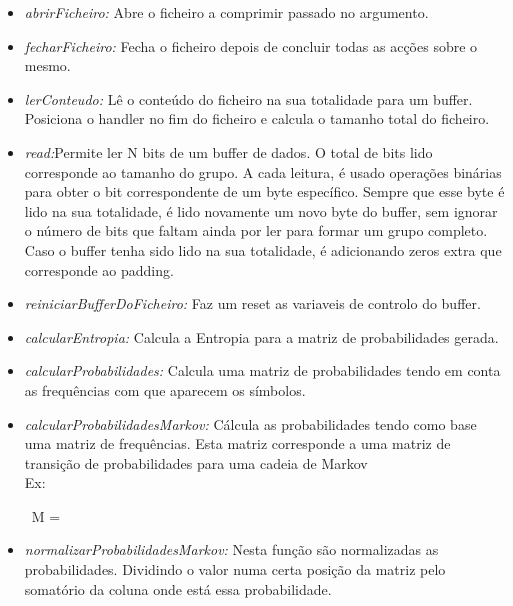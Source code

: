 \documentclass[paper=a4, fontsize=11pt]{scrartcl}
\numberwithin{equation}{section}		%
\numberwithin{figure}{section}			%
\numberwithin{table}{section}				%
\begin{document}
\begin{itemize}
\item {\it abrirFicheiro:} Abre o ficheiro a comprimir passado no argumento.

\item {\it fecharFicheiro:} Fecha o ficheiro depois de concluir todas as acções sobre o mesmo.

\item {\it lerConteudo:} Lê o conteúdo do ficheiro na sua totalidade para um buffer.
\\Posiciona o handler no fim do ficheiro e calcula o tamanho total do ficheiro.

\item {\it read:}Permite ler N bits de um buffer de dados. O total de bits lido corresponde ao tamanho do grupo. A cada leitura, é usado operações binárias para obter o bit correspondente de um byte específico. Sempre que esse byte é lido na sua totalidade, é lido novamente um novo byte do buffer, sem ignorar o número de bits que faltam ainda por ler para formar um grupo completo.
\\
Caso o buffer tenha sido lido na sua totalidade, é adicionando zeros extra que corresponde ao padding.

\item {\it reiniciarBufferDoFicheiro:} Faz um reset as variaveis de controlo do buffer.

\item {\it calcularEntropia:} Calcula a Entropia para a matriz de probabilidades gerada.

\item {\it calcularProbabilidades:} Calcula uma matriz de probabilidades tendo em conta as frequências com que aparecem os símbolos.

\item {\it calcularProbabilidadesMarkov:} Cálcula as probabilidades tendo como base uma matriz de frequências. Esta matriz corresponde a uma matriz de transição de probabilidades para uma cadeia de Markov \\ Ex:

\begin{center}  
\ M =   
\end{center}


\item {\it normalizarProbabilidadesMarkov:} Nesta função são normalizadas as probabilidades. Dividindo o valor numa certa posição da matriz pelo somatório da coluna onde está essa probabilidade.


\end{itemize}
\end{document}
